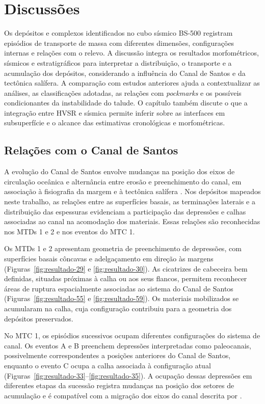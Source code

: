 \chapter{Discussões}\label{cap:discussao}

Os depósitos e complexos identificados no cubo sísmico BS-500 registram episódios de transporte de massa com diferentes dimensões, configurações internas e relações com o relevo. A discussão integra os resultados morfométricos, sísmicos e estratigráficos para interpretar a distribuição, o transporte e a acumulação dos depósitos, considerando a influência do Canal de Santos e da tectônica salífera. A comparação com estudos anteriores ajuda a contextualizar as análises, as classificações adotadas, as relações com \textit{pockmarks} e os possíveis condicionantes da instabilidade do talude. O capítulo também discute o que a integração entre HVSR e sísmica permite inferir sobre as interfaces em subsuperfície e o alcance das estimativas cronológicas e morfométricas.

\section{Relações com o Canal de Santos}\label{sec:6-1}

A evolução do Canal de Santos envolve mudanças na posição dos eixos de circulação oceânica e alternância entre erosão e preenchimento do canal, em associação à fisiografia da margem e à tectônica salífera \cite{dutra2019}. Nos depósitos mapeados neste trabalho, as relações entre as superfícies basais, as terminações laterais e a distribuição das espessuras evidenciam a participação das depressões e calhas associadas ao canal na acomodação dos materiais. Essas relações são reconhecidas nos MTDs 1 e 2 e nos eventos do MTC 1.

Os MTDs 1 e 2 apresentam geometria de preenchimento de depressões, com superfícies basais côncavas e adelgaçamento em direção às margens (Figuras~\ref{fig:resultado-29} e \ref{fig:resultado-30}). As cicatrizes de cabeceira bem definidas, situadas próximas à calha ou aos seus flancos, permitem reconhecer áreas de ruptura espacialmente associadas ao sistema do Canal de Santos (Figuras~\ref{fig:resultado-55} e \ref{fig:resultado-59}). Os materiais mobilizados se acumularam na calha, cuja configuração contribuiu para a geometria dos depósitos preservados.

No MTC 1, os episódios sucessivos ocupam diferentes configurações do sistema de canal. Os eventos A e B preenchem depressões interpretadas como paleocanais, possivelmente correspondentes a posições anteriores do Canal de Santos, enquanto o evento C ocupa a calha associada à configuração atual (Figuras~\ref{fig:resultado-33}--\ref{fig:resultado-35}). A ocupação dessas depressões em diferentes etapas da sucessão registra mudanças na posição dos setores de acumulação e é compatível com a migração dos eixos do canal descrita por .


